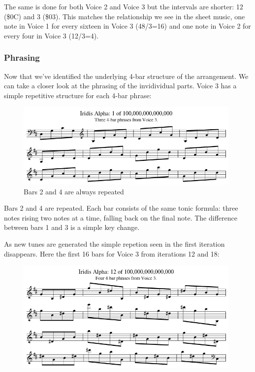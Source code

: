The same is done for both Voice 2 and Voice 3 but the intervals are shorter: 12 (\$0C) and 3 (\$03). This matches
the relationship we see in the sheet music, one note in Voice 1 for every sixteen in Voice 3 (48/3=16) and one note in
Voice 2 for every four in Voice 3 (12/3=4).

%


%


\subsubsection{Phrasing}
Now that we've identified the underlying 4-bar structure of the arrangement. We can take a closer look at the 
phrasing of the invidividual parts. Voice 3 has a simple repetitive structure for each 4-bar phrase:

\begin{figure}[H]
{
  \begin{adjustbox}{width=11cm,center}
  \includegraphics[width=11cm]{music/Voice_3_Phrasing1.png}%
    \end{adjustbox}
}\caption[]{Bars 2 and 4 are always repeated}
\end{figure}

Bars 2 and 4 are repeated. Each bar consists of the same tonic formula: three notes rising two notes at a time,
falling back on the final note. The difference between bars 1 and 3 is a simple key change.

As new tunes are generated the simple repetion seen in the first iteration disappears. Here the first 16 bars
for Voice 3 from iterations 12 and 18:


\begin{figure}[H]
{
  \begin{adjustbox}{width=11cm,center}
  \includegraphics[width=11cm]{music/Voice_3_Phrasing_Tune12.png}%
    \end{adjustbox}
}
\end{figure}


